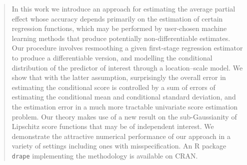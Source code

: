 \documentclass[aos]{imsart}
\begin{document}
\begin{frontmatter}
\begin{abstract}
	In this work we introduce an approach for estimating the average partial effect whose accuracy depends primarily on the estimation of certain regression functions, which may be performed by user-chosen machine learning methods that produce potentially non-differentiable estimates. Our procedure involves resmoothing a given first-stage regression estimator to produce a differentiable version, and modelling the conditional distribution of the predictor of interest through a location--scale model. We show that with the latter assumption, surprisingly the overall error in estimating the conditional score is controlled by a sum of errors of estimating the conditional mean and conditional standard deviation, and the estimation error in a much more tractable univariate score estimation problem. Our theory makes use of a new result  on the sub-Gaussianity of Lipschitz score functions that may be of independent interest. We demonstrate the attractive numerical performance of our approach in a variety of settings including ones with misspecification.
	An R package \texttt{drape} implementing the methodology is available on CRAN.
\end{abstract}
	\end{frontmatter}
	
\end{document}

